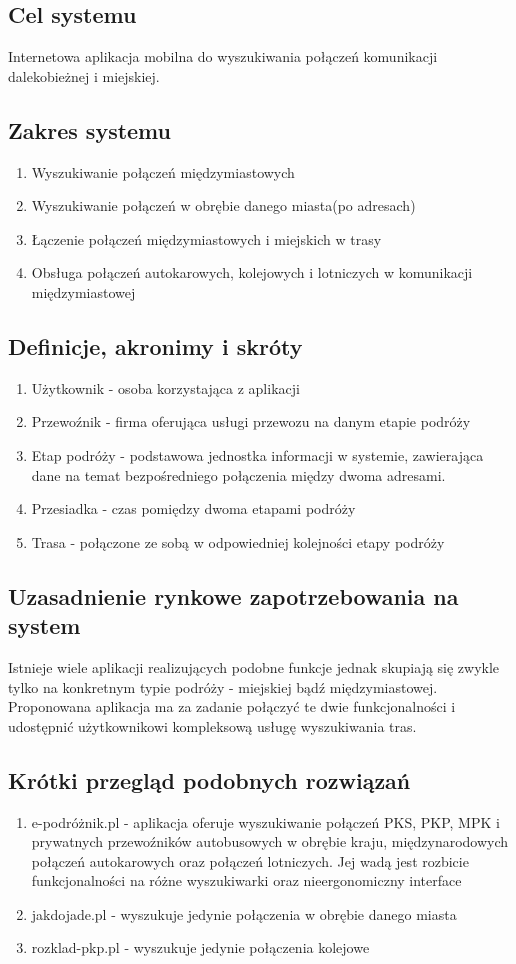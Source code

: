 \documentclass[12pt,a4paper]{report}
\begin{document}
\subsection{Cel systemu}
	Internetowa aplikacja mobilna do wyszukiwania połączeń komunikacji dalekobieżnej i miejskiej.
\subsection{Zakres systemu}
\begin{enumerate}
	\item Wyszukiwanie połączeń międzymiastowych
	\item Wyszukiwanie połączeń w obrębie danego miasta(po adresach)
	\item Łączenie połączeń międzymiastowych i miejskich w trasy
	\item Obsługa połączeń autokarowych, kolejowych i lotniczych w komunikacji międzymiastowej
\end{enumerate}
\subsection{Definicje, akronimy i skróty}
\begin{enumerate}
	\item Użytkownik - osoba korzystająca z aplikacji
	\item Przewoźnik - firma oferująca usługi przewozu na danym etapie podróży
	\item Etap podróży - podstawowa jednostka informacji w systemie, zawierająca dane na temat bezpośredniego połączenia między dwoma adresami.
	\item Przesiadka - czas pomiędzy dwoma etapami podróży
	\item Trasa - połączone ze sobą w odpowiedniej kolejności etapy podróży
\end{enumerate}
\subsection{Uzasadnienie rynkowe zapotrzebowania na system}
	Istnieje wiele aplikacji realizujących podobne funkcje jednak skupiają się zwykle tylko na konkretnym typie podróży - miejskiej bądź międzymiastowej. Proponowana aplikacja ma za zadanie połączyć te dwie funkcjonalności i udostępnić użytkownikowi kompleksową usługę wyszukiwania tras. 
\subsection{Krótki przegląd podobnych rozwiązań}
\begin{enumerate}
	\item e-podróżnik.pl - aplikacja oferuje wyszukiwanie połączeń PKS, PKP, MPK i prywatnych przewoźników autobusowych w obrębie kraju, międzynarodowych połączeń autokarowych oraz połączeń lotniczych. Jej wadą jest rozbicie funkcjonalności na różne wyszukiwarki oraz nieergonomiczny interface
	\item jakdojade.pl - wyszukuje jedynie połączenia w obrębie danego miasta
	\item rozklad-pkp.pl - wyszukuje jedynie połączenia kolejowe
\end{enumerate}
\end{document}

